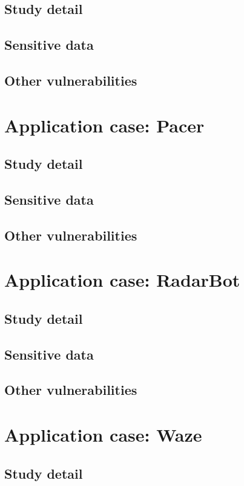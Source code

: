 		\subsection{Study detail}
			\par 
		\subsection{Sensitive data}
		\subsection{Other vulnerabilities}

	\section{Application case: Pacer}
	\label{sec:pacer}
		\subsection{Study detail}
		\subsection{Sensitive data}
		\subsection{Other vulnerabilities}
		
	\section{Application case: RadarBot}
		\subsection{Study detail}
		\subsection{Sensitive data}
		\subsection{Other vulnerabilities}

	\section{Application case: Waze}
		\subsection{Study detail}
